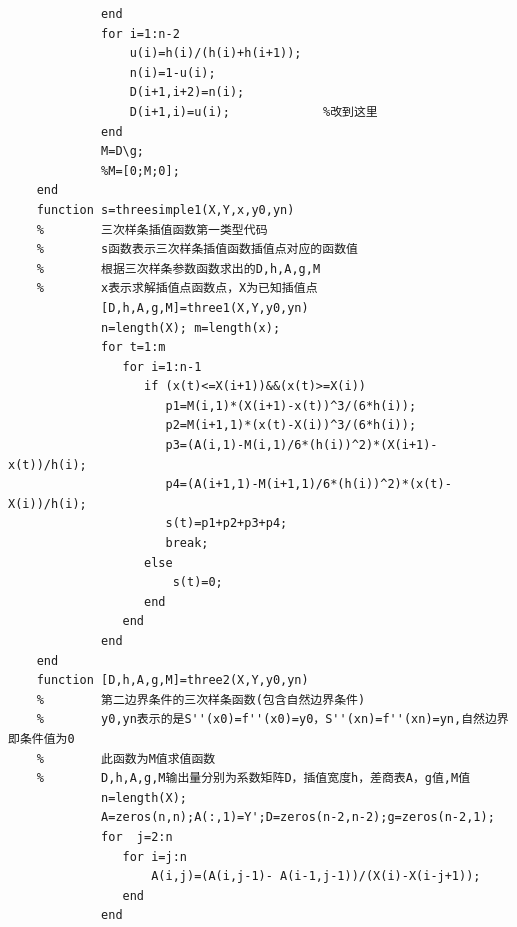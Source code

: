 \documentclass[UTF8,a4paper,10pt]{ctexart}
\begin{document}
\begin{lstlisting}
             end  
             for i=1:n-2
                 u(i)=h(i)/(h(i)+h(i+1));
                 n(i)=1-u(i);  
                 D(i+1,i+2)=n(i);
                 D(i+1,i)=u(i);             %改到这里
             end
             M=D\g;
             %M=[0;M;0];         
    end
    function s=threesimple1(X,Y,x,y0,yn)
    %        三次样条插值函数第一类型代码 
    %        s函数表示三次样条插值函数插值点对应的函数值
    %        根据三次样条参数函数求出的D,h,A,g,M
    %        x表示求解插值点函数点，X为已知插值点        
             [D,h,A,g,M]=three1(X,Y,y0,yn)
             n=length(X); m=length(x);    
             for t=1:m
                for i=1:n-1
                   if (x(t)<=X(i+1))&&(x(t)>=X(i))
                      p1=M(i,1)*(X(i+1)-x(t))^3/(6*h(i));
                      p2=M(i+1,1)*(x(t)-X(i))^3/(6*h(i));
                      p3=(A(i,1)-M(i,1)/6*(h(i))^2)*(X(i+1)-x(t))/h(i);
                      p4=(A(i+1,1)-M(i+1,1)/6*(h(i))^2)*(x(t)-X(i))/h(i);
                      s(t)=p1+p2+p3+p4; 
                      break;
                   else
                       s(t)=0; 
                   end
                end
             end
    end
    function [D,h,A,g,M]=three2(X,Y,y0,yn)
    %        第二边界条件的三次样条函数(包含自然边界条件)
    %        y0,yn表示的是S''(x0)=f''(x0)=y0，S''(xn)=f''(xn)=yn,自然边界即条件值为0 
    %        此函数为M值求值函数
    %        D,h,A,g,M输出量分别为系数矩阵D，插值宽度h，差商表A，g值,M值 
             n=length(X); 
             A=zeros(n,n);A(:,1)=Y';D=zeros(n-2,n-2);g=zeros(n-2,1);
             for  j=2:n
                for i=j:n
                    A(i,j)=(A(i,j-1)- A(i-1,j-1))/(X(i)-X(i-j+1));
                end
             end
             

\end{lstlisting}
\end{document}
